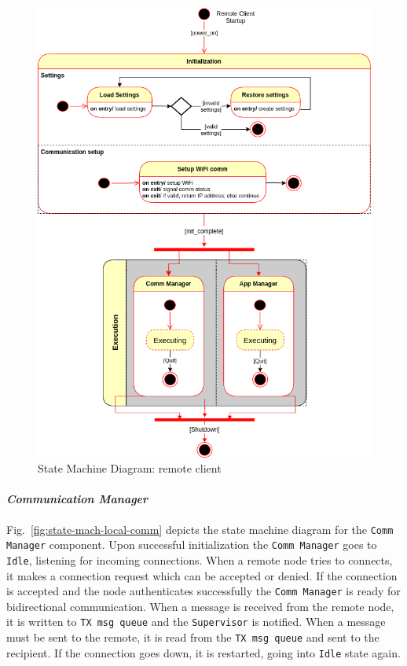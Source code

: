 %
\begin{figure}[htb!]
\centering
    \includegraphics[width=0.7\columnwidth]{./img/state-mach-rc.png}
  \caption{State Machine Diagram: remote client}%
\label{fig:state-mach-rc}
\end{figure}
%

\paragraph{\emph{Communication Manager}}
Fig.~\ref{fig:state-mach-local-comm} depicts the state machine diagram for the
\texttt{Comm Manager} component. Upon successful initialization the
\texttt{Comm Manager} goes to \texttt{Idle}, listening for incoming
connections. When a remote node tries to connects, it makes a connection request
which can be accepted or denied. If the connection is accepted and the node
authenticates successfully the \texttt{Comm Manager} is ready for bidirectional
communication. When a message is received from the remote node, it is written to
\texttt{TX msg queue} and the \texttt{Supervisor} is notified. When a message
must be sent to the remote, it is read from the \texttt{TX msg queue} and sent
to the recipient. If the connection goes down, it is restarted, going into
\texttt{Idle} state again.

